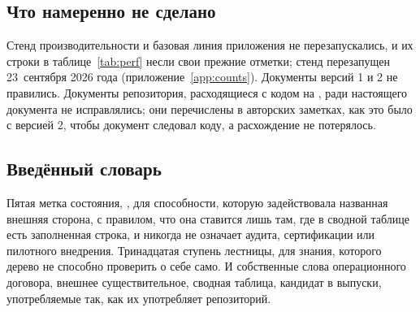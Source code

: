 \subsection*{Что намеренно не сделано}

Стенд производительности и базовая линия приложения не перезапускались, и их строки в
таблице~\ref{tab:perf} несли свои прежние отметки; стенд перезапущен 23~сентября 2026 года
(приложение~\ref{app:counts}). Документы версий 1 и 2 не правились. Документы
репозитория, расходящиеся с кодом на , ради настоящего документа не
исправлялись; они перечислены в авторских заметках, как это было с версией 2, чтобы документ
следовал коду, а расхождение не потерялось.

\subsection*{Введённый словарь}

Пятая метка состояния, \sWit, для способности, которую задействовала названная внешняя сторона,
с правилом, что она ставится лишь там, где в сводной таблице есть заполненная строка, и никогда
не означает аудита, сертификации или пилотного внедрения. Тринадцатая ступень лестницы, для
знания, которого дерево не способно проверить о себе само. И собственные слова операционного
договора, внешнее существительное, сводная таблица, кандидат в выпуски, употребляемые так, как их
употребляет репозиторий.
